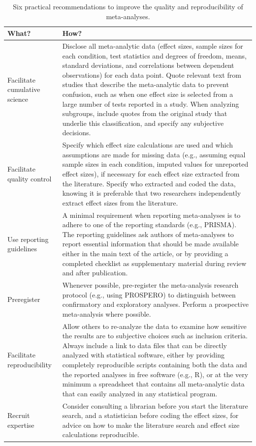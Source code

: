 \documentclass[
  oneside]{krantz}
\begin{document}
\begin{table}

\caption{\label{tab:table-rec1}Six practical recommendations to improve the quality and reproducibility of meta-analyses.}
\centering
\begin{tabular}[t]{>{\raggedright\arraybackslash}p{5cm}|>{\raggedright\arraybackslash}p{10cm}}
\hline
What? & How?\\
\hline
Facilitate cumulative science & Disclose all meta-analytic data (effect sizes, sample sizes for each condition, test statistics and degrees of freedom, means, standard deviations, and correlations between dependent observations) for each data point. Quote relevant text from studies that describe the meta-analytic data to prevent confusion, such as when one effect size is selected from a large number of tests reported in a study. When analyzing subgroups, include quotes from the original study that underlie this classification, and specify any subjective decisions.\\
\hline
Facilitate quality control & Specify which effect size calculations are used and which assumptions are made for missing data (e.g., assuming equal sample sizes in each condition, imputed values for unreported effect sizes), if necessary for each effect size extracted from the literature. Specify who extracted and coded the data, knowing it is preferable that two researchers independently extract effect sizes from the literature.\\
\hline
Use reporting guidelines & A minimal requirement when reporting meta-analyses is to adhere to one of the reporting standards (e.g., PRISMA). The reporting guidelines ask authors of meta-analyses to report essential information that should be made available either in the main text of the article, or by providing a completed checklist as supplementary material during review and after publication.\\
\hline
Preregister & Whenever possible, pre-register the meta-analysis research protocol (e.g., using PROSPERO) to distinguish between confirmatory and exploratory analyses. Perform a prospective meta-analysis where possible.\\
\hline
Facilitate reproducibility & Allow others to re-analyze the data to examine how sensitive the results are to subjective choices such as inclusion criteria. Always include a link to data files that can be directly analyzed with statistical software, either by providing completely reproducible scripts containing both the data and the reported analyses in free software (e.g., R), or at the very minimum a spreadsheet that contains all meta-analytic data that can easily analyzed in any statistical program.\\
\hline
Recruit expertise & Consider consulting a librarian before you start the literature search, and a statistician before coding the effect sizes, for advice on how to make the literature search and effect size calculations reproducible.\\
\hline
\end{tabular}
\end{table}
\end{document}
